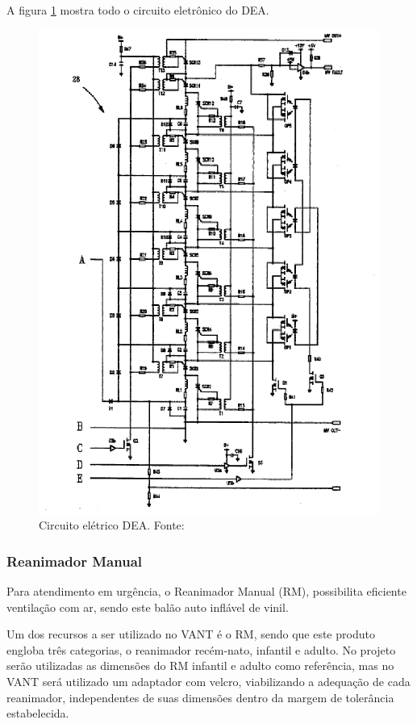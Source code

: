 A figura \ref{fig:circuitodea} mostra todo o circuito eletrônico do DEA.

\begin{figure}[H]
	\centering
		\includegraphics[keepaspectratio=true,scale=1.2,angle=-90]{figuras/circuitodea.eps}
	\caption{Circuito elétrico DEA. Fonte: \cite{dea}}
	\label{fig:circuitodea}
\end{figure}

\subsubsection{Reanimador Manual}
Para atendimento em urgência, o Reanimador Manual (RM), possibilita eficiente ventilação com ar, sendo este balão auto inflável de vinil.

Um dos recursos a ser utilizado no VANT é o RM, sendo que este produto engloba três categorias, o reanimador recém-nato, infantil e adulto. No projeto serão utilizadas as dimensões do RM infantil e adulto como referência, mas no VANT será utilizado um adaptador com velcro, viabilizando a adequação de cada reanimador, independentes de suas dimensões dentro da margem de tolerância estabelecida.

